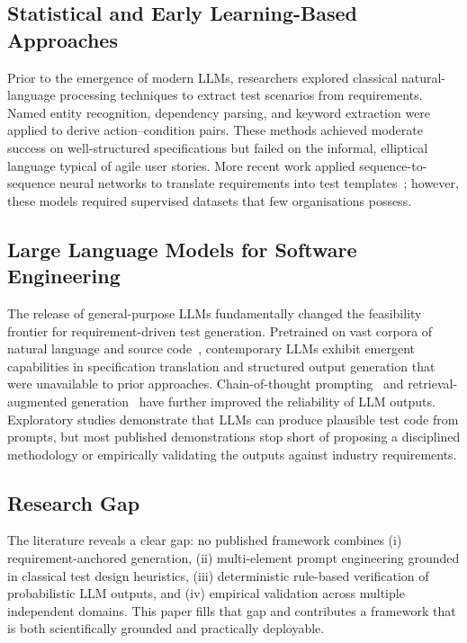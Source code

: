 \documentclass[11pt,letterpaper]{article}
\begin{document}
\subsection{Statistical and Early Learning-Based Approaches}

Prior to the emergence of modern LLMs, researchers explored classical natural-language processing techniques to extract test scenarios from requirements. Named entity recognition, dependency parsing, and keyword extraction were applied to derive action--condition pairs. These methods achieved moderate success on well-structured specifications but failed on the informal, elliptical language typical of agile user stories. More recent work applied sequence-to-sequence neural networks to translate requirements into test templates~\cite{tufano2020}; however, these models required supervised datasets that few organisations possess.

\subsection{Large Language Models for Software Engineering}

The release of general-purpose LLMs fundamentally changed the feasibility frontier for requirement-driven test generation. Pretrained on vast corpora of natural language and source code~\cite{brown2020,codex2021}, contemporary LLMs exhibit emergent capabilities in specification translation and structured output generation that were unavailable to prior approaches. Chain-of-thought prompting~\cite{cot2022} and retrieval-augmented generation~\cite{rag2020} have further improved the reliability of LLM outputs. Exploratory studies demonstrate that LLMs can produce plausible test code from prompts, but most published demonstrations stop short of proposing a disciplined methodology or empirically validating the outputs against industry requirements.

\subsection{Research Gap}

The literature reveals a clear gap: no published framework combines (i) requirement-anchored generation, (ii) multi-element prompt engineering grounded in classical test design heuristics, (iii) deterministic rule-based verification of probabilistic LLM outputs, and (iv) empirical validation across multiple independent domains. This paper fills that gap and contributes a framework that is both scientifically grounded and practically deployable.
\end{document}
